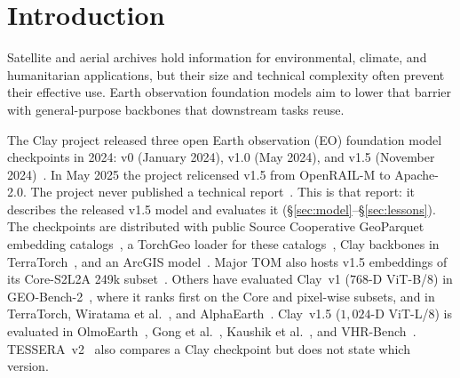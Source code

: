 \section{Introduction}
\label{sec:intro}

Satellite and aerial archives hold information for environmental, climate, and humanitarian applications, but their size and technical complexity often prevent their effective use. Earth observation foundation models aim to lower that barrier with general-purpose backbones that downstream tasks reuse.

The Clay project released three open Earth observation (EO) foundation model checkpoints in 2024: v0 (January 2024), v1.0 (May 2024), and v1.5 (November 2024)~\cite{clay2024model,clay2024hf}. In May 2025 the project relicensed v1.5 from OpenRAIL-M to Apache-2.0. The project never published a technical report~\cite{clay2025issue369}. This is that report: it describes the released v1.5 model and evaluates it (\S\ref{sec:model}--\S\ref{sec:lessons}). The checkpoints are distributed with public Source Cooperative GeoParquet embedding catalogs~\cite{clay2026sourcecoop}, a TorchGeo loader for these catalogs~\cite{torchgeo2026clayembeddings}, Clay backbones in TerraTorch~\cite{terratorch2026claybackbones,gomes2025terratorch}, and an ArcGIS model~\cite{esri2025claydlpk}. Major TOM also hosts v1.5 embeddings of its Core-S2L2A 249k subset~\cite{majortom2026clayv15}. Others have evaluated Clay~v1 ($768\text{-D}$ ViT-B/8) in GEO-Bench-2~\cite{simumba2026geobench2}, where it ranks first on the Core and pixel-wise subsets, and in TerraTorch, Wiratama et al.~\cite{wiratama2025indonesia}, and AlphaEarth~\cite{brown2025alphaearth}. Clay~v1.5 ($1{,}024\text{-D}$ ViT-L/8) is evaluated in OlmoEarth~\cite{herzog2026olmoearth,olmoearth2026v13}, Gong et al.~\cite{gong2026urban}, Kaushik et al.~\cite{kaushik2026flood}, and VHR-Bench~\cite{sharma2026vhrbench}. TESSERA~v2~\cite{feng2026tesserav2} also compares a Clay checkpoint but does not state which version.

